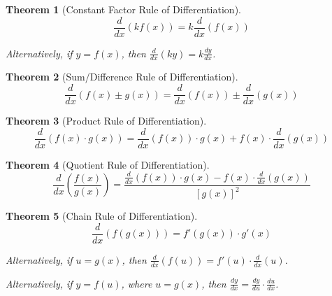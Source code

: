 \documentclass[12pt,]{book}
\theoremstyle{plain}
\newtheorem{theorem}{Theorem}[section]
\theoremstyle{definition}
\theoremstyle{definition}
\theoremstyle{definition}
\theoremstyle{definition}
\theoremstyle{definition}
\numberwithin{equation}{section}
\newcommand{\fe}[2]{#1\mathopen{}\left(#2\right)\mathclose{}}
\newcommand{\fd}[1]{#1'}
\newcommand{\lz}[2]{\frac{d#1}{d#2}}
\newcommand{\lzoo}[2]{{\frac{d}{d#1}}{\left(#2\right)}}
\begin{document}
\begin{theorem}[{Constant Factor Rule of Differentiation}]\label{theorem-11}
\begin{equation*}\lzoo{x}{k\fe{f}{x}}=k\lzoo{x}{\fe{f}{x}}\end{equation*}%
\par
Alternatively, if \(y=\fe{f}{x}\), then \(\lzoo{x}{ky}=k\lz{y}{x}\).%
\end{theorem}
\begin{theorem}[{Sum/Difference Rule of Differentiation}]\label{theorem-12}
\begin{equation*}\lzoo{x}{\fe{f}{x}\pm\fe{g}{x}}=\lzoo{x}{\fe{f}{x}}\pm\lzoo{x}{\fe{g}{x}}\end{equation*}%
\end{theorem}
\begin{theorem}[{Product Rule of Differentiation}]\label{theorem-13}
\begin{equation*}\lzoo{x}{\fe{f}{x}\cdot\fe{g}{x}}=\lzoo{x}{\fe{f}{x}}\cdot\fe{g}{x}+\fe{f}{x}\cdot\lzoo{x}{\fe{g}{x}}\end{equation*}%
\end{theorem}
\begin{theorem}[{Quotient Rule of Differentiation}]\label{theorem-14}
\begin{equation*}\lzoo{x}{\frac{\fe{f}{x}}{\fe{g}{x}}}=\frac{\lzoo{x}{\fe{f}{x}}\cdot\fe{g}{x}-\fe{f}{x}\cdot\lzoo{x}{\fe{g}{x}}}{\left[\fe{g}{x}\right]^2}\end{equation*}%
\end{theorem}
\begin{theorem}[{Chain Rule of Differentiation}]\label{theorem-15}
\begin{equation*}\lzoo{x}{\fe{f}{\fe{g}{x}}}=\fe{\fd{f}}{\fe{g}{x}}\cdot\fe{\fd{g}}{x}\end{equation*}%
\par
Alternatively, if \(u=\fe{g}{x}\), then \(\lzoo{x}{\fe{f}{u}}=\fe{\fd{f}}{u}\cdot\lzoo{x}{u}\).%
\par
Alternatively, if \(y=\fe{f}{u}\), where \(u=\fe{g}{x}\), then \(\lz{y}{x}=\lz{y}{u}\cdot\lz{u}{x}\).%
\end{theorem}
\typeout{************************************************}
\typeout{************************************************}
\end{document}

